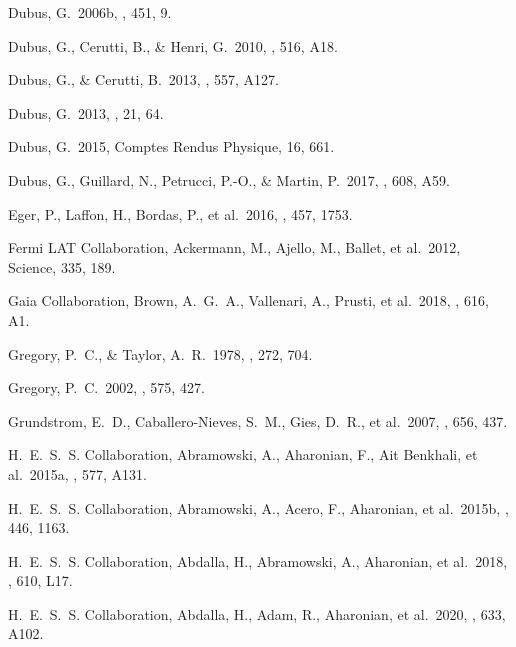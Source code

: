 \documentclass{aa}
\begin{document}
\begin{thebibliography}{}
 Dubus, G.\ 2006b, \aap, 451, 9.


 Dubus, G., Cerutti, B., \& Henri, G.\ 2010, \aap, 516, A18.

 Dubus, G., \& Cerutti, B.\ 2013, \aap, 557, A127.

 Dubus, G.\ 2013, \aapr, 21, 64.

 Dubus, G.\ 2015, Comptes Rendus Physique, 16, 661.

 Dubus, G., Guillard, N., Petrucci, P.-O., \& Martin, P.\ 2017, \aap, 608, A59.

 Eger, P., Laffon, H., Bordas, P., et al.\ 2016, \mnras, 457, 1753.

 Fermi LAT Collaboration, Ackermann, M., Ajello, M., Ballet, et al.\ 2012, Science, 335, 189.

 Gaia Collaboration, Brown, A.~G.~A., Vallenari, A., Prusti, et al.\ 2018, \aap, 616, A1.

 Gregory, P.~C., \& Taylor, A.~R.\ 1978, \nat, 272, 704.

 Gregory, P.~C.\ 2002, \apj, 575, 427.

 Grundstrom, E.~D., Caballero-Nieves, S.~M., Gies, D.~R., et al.\ 2007, \apj, 656, 437.

 H.~E.~S.~S. Collaboration, Abramowski, A., Aharonian, F., Ait Benkhali, et al.\ 2015a, \aap, 577, A131.

 H.~E.~S.~S. Collaboration, Abramowski, A., Acero, F., Aharonian, et al.\ 2015b, \mnras, 446, 1163.

 H.~E.~S.~S. Collaboration, Abdalla, H., Abramowski, A., Aharonian, et al.\ 2018, \aap, 610, L17.

 H.~E.~S.~S. Collaboration, Abdalla, H., Adam, R., Aharonian, et al.\ 2020, \aap, 633, A102.


\end{thebibliography}
\end{document}
